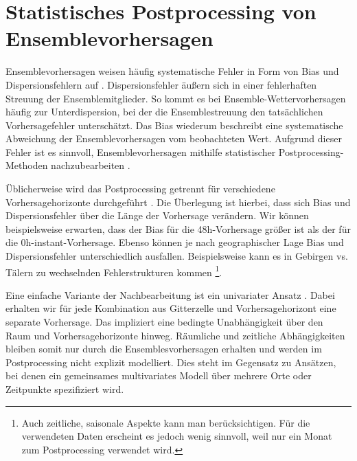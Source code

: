 \documentclass{article}
\numberwithin{equation}{section}
\begin{document}
\section{Statistisches Postprocessing von Ensemblevorhersagen} \label{sec:postprocess}
Ensemblevorhersagen weisen häufig systematische Fehler in Form von Bias und Dispersionsfehlern auf \parencite{vannitsem_statistical_2021}. Dispersionsfehler äußern sich in einer fehlerhaften Streuung der Ensemblemitglieder. So kommt es bei Ensemble-Wettervorhersagen häufig zur Unterdispersion, bei der die Ensemblestreuung den tatsächlichen Vorhersagefehler unterschätzt. Das Bias wiederum beschreibt eine systematische Abweichung der Ensemblevorhersagen vom beobachteten Wert. Aufgrund dieser Fehler ist es sinnvoll, Ensemblevorhersagen mithilfe statistischer Postprocessing-Methoden nachzubearbeiten \parencite{vannitsem_statistical_2021, gneiting_probabilistic_2014}.

Üblicherweise wird das Postprocessing getrennt für verschiedene Vorhersagehorizonte durchgeführt \parencite{vannitsem_statistical_2021, climaguidelines}. Die Überlegung ist hierbei, dass sich Bias und Dispersionsfehler über die Länge der Vorhersage verändern. Wir können beispielsweise erwarten, dass der Bias für die 48h-Vorhersage größer ist als der für die 0h-instant-Vorhersage. Ebenso können je nach geographischer Lage Bias und Dispersionsfehler unterschiedlich ausfallen. Beispielsweise kann es in Gebirgen vs. Tälern zu wechselnden Fehlerstrukturen kommen \footnote{Auch zeitliche, saisonale Aspekte kann man berücksichtigen. Für die verwendeten Daten erscheint es jedoch wenig sinnvoll, weil nur ein Monat zum Postprocessing verwendet wird.}.

Eine einfache Variante der Nachbearbeitung ist ein univariater Ansatz \parencite{vannitsem_statistical_2021, climaguidelines}. Dabei erhalten wir für jede Kombination aus Gitterzelle und Vorhersagehorizont eine separate Vorhersage. Das impliziert eine bedingte Unabhängigkeit über den Raum und Vorhersagehorizonte hinweg. Räumliche und zeitliche Abhängigkeiten bleiben somit nur durch die Ensemblesvorhersagen erhalten und werden im Postprocessing nicht explizit modelliert. Dies steht im Gegensatz zu Ansätzen, bei denen ein gemeinsames multivariates Modell über mehrere Orte oder Zeitpunkte spezifiziert wird.
\end{document}
